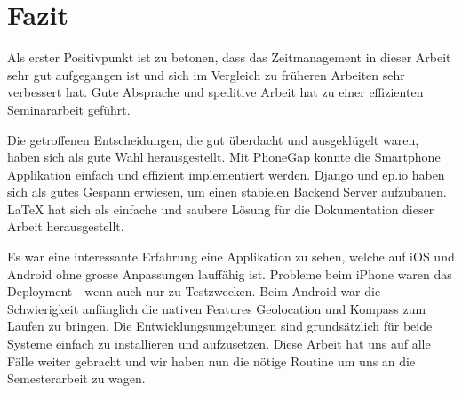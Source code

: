 
\newpage
\section{Fazit} %
\label{sec:Fazit}

Als erster Positivpunkt ist zu betonen, dass das Zeitmanagement in dieser Arbeit sehr gut aufgegangen ist und sich im Vergleich zu früheren Arbeiten sehr verbessert hat. Gute Absprache und speditive Arbeit hat zu einer effizienten Seminararbeit geführt.

Die getroffenen Entscheidungen, die gut überdacht und ausgeklügelt waren, haben sich als gute Wahl herausgestellt. Mit PhoneGap konnte die Smartphone Applikation einfach und effizient implementiert werden. Django und ep.io haben sich als gutes Gespann erwiesen, um einen stabielen Backend Server aufzubauen. LaTeX hat sich als einfache und saubere Lösung für die Dokumentation dieser Arbeit herausgestellt.

Es war eine interessante Erfahrung eine Applikation zu sehen, welche auf iOS und Android ohne grosse Anpassungen lauffähig ist. Probleme beim iPhone waren das Deployment - wenn auch nur zu Testzwecken. Beim Android war die Schwierigkeit anfänglich die nativen Features Geolocation und Kompass zum Laufen zu bringen. Die Entwicklungsumgebungen sind grundsätzlich für beide Systeme einfach zu installieren und aufzusetzen. Diese Arbeit hat uns auf alle Fälle weiter gebracht und wir haben nun die nötige Routine um uns an die Semesterarbeit zu wagen.

